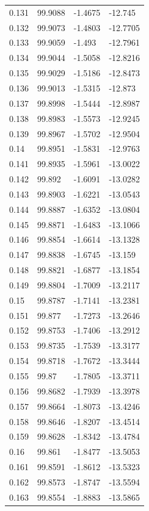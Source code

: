 \begin{tabular}{llll}
0.131 & 99.9088 & -1.4675 & -12.745 \\
0.132 & 99.9073 & -1.4803 & -12.7705 \\
0.133 & 99.9059 & -1.493 & -12.7961 \\
0.134 & 99.9044 & -1.5058 & -12.8216 \\
0.135 & 99.9029 & -1.5186 & -12.8473 \\
0.136 & 99.9013 & -1.5315 & -12.873 \\
0.137 & 99.8998 & -1.5444 & -12.8987 \\
0.138 & 99.8983 & -1.5573 & -12.9245 \\
0.139 & 99.8967 & -1.5702 & -12.9504 \\
0.14 & 99.8951 & -1.5831 & -12.9763 \\
0.141 & 99.8935 & -1.5961 & -13.0022 \\
0.142 & 99.892 & -1.6091 & -13.0282 \\
0.143 & 99.8903 & -1.6221 & -13.0543 \\
0.144 & 99.8887 & -1.6352 & -13.0804 \\
0.145 & 99.8871 & -1.6483 & -13.1066 \\
0.146 & 99.8854 & -1.6614 & -13.1328 \\
0.147 & 99.8838 & -1.6745 & -13.159 \\
0.148 & 99.8821 & -1.6877 & -13.1854 \\
0.149 & 99.8804 & -1.7009 & -13.2117 \\
0.15 & 99.8787 & -1.7141 & -13.2381 \\
0.151 & 99.877 & -1.7273 & -13.2646 \\
0.152 & 99.8753 & -1.7406 & -13.2912 \\
0.153 & 99.8735 & -1.7539 & -13.3177 \\
0.154 & 99.8718 & -1.7672 & -13.3444 \\
0.155 & 99.87 & -1.7805 & -13.3711 \\
0.156 & 99.8682 & -1.7939 & -13.3978 \\
0.157 & 99.8664 & -1.8073 & -13.4246 \\
0.158 & 99.8646 & -1.8207 & -13.4514 \\
0.159 & 99.8628 & -1.8342 & -13.4784 \\
0.16 & 99.861 & -1.8477 & -13.5053 \\
0.161 & 99.8591 & -1.8612 & -13.5323 \\
0.162 & 99.8573 & -1.8747 & -13.5594 \\
0.163 & 99.8554 & -1.8883 & -13.5865 \\

\end{tabular}
